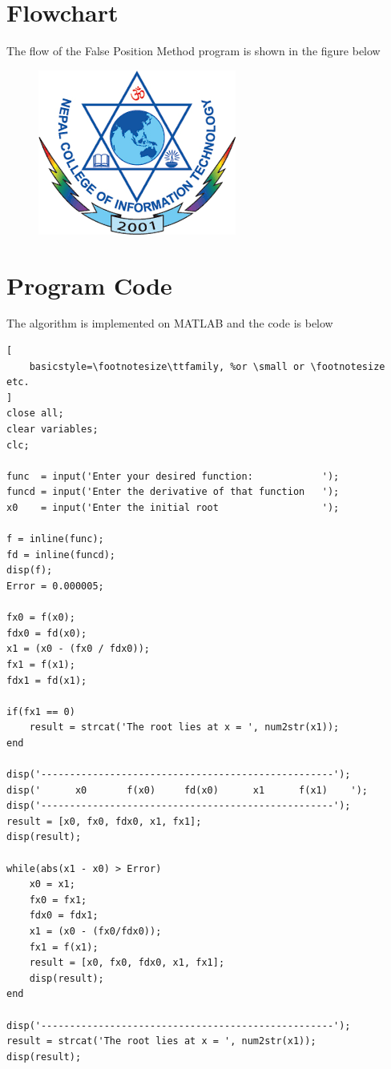 \documentclass[12pt, a4paper, titlepage]{article}
\begin{document}
\section{Flowchart}
The flow of the False Position Method program is shown in the figure below
\begin{figure}[h]
		\centering
		\includegraphics[scale=0.7]{newtonraphsonflowchart}
\end{figure}
\section{Program Code}
The algorithm is implemented on MATLAB and the code is below
\begin{lstlisting}[
    basicstyle=\footnotesize\ttfamily, %or \small or \footnotesize etc.
]
close all;
clear variables;
clc;

func  = input('Enter your desired function:            ');
funcd = input('Enter the derivative of that function   ');
x0    = input('Enter the initial root                  ');

f = inline(func);
fd = inline(funcd);
disp(f);
Error = 0.000005;

fx0 = f(x0);
fdx0 = fd(x0);
x1 = (x0 - (fx0 / fdx0));
fx1 = f(x1);
fdx1 = fd(x1);

if(fx1 == 0)
    result = strcat('The root lies at x = ', num2str(x1));
end

disp('---------------------------------------------------');
disp('      x0       f(x0)     fd(x0)      x1      f(x1)    ');
disp('---------------------------------------------------');
result = [x0, fx0, fdx0, x1, fx1];
disp(result);

while(abs(x1 - x0) > Error)
    x0 = x1;
    fx0 = fx1;
    fdx0 = fdx1;
    x1 = (x0 - (fx0/fdx0));
    fx1 = f(x1);
    result = [x0, fx0, fdx0, x1, fx1];
    disp(result);    
end

disp('---------------------------------------------------');
result = strcat('The root lies at x = ', num2str(x1));
disp(result);  
\end{lstlisting}
\end{document}
